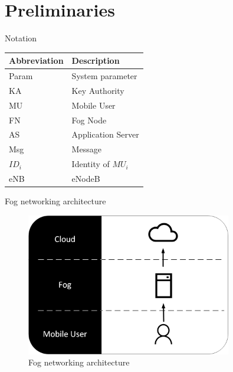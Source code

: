 \documentclass{beamer}
\begin{document}
\section{Preliminaries}
\begin{frame}{Notation}
    \begin{center}
        \begin{tabular}{ | l | l | }
            \hline
                Abbreviation                     &       Description               \\ \hline
                Param                            &       System parameter        \\ \hline
                KA                               &       Key Authority          \\ \hline
                MU                               &       Mobile User       \\ \hline
                FN                               &       Fog Node       \\ \hline
                AS                               &       Application Server       \\ \hline
                Msg                              &       Message                 \\ \hline
                $ID_{i}$                         &       Identity of $MU_{i}$           \\ \hline
                eNB                              &       eNodeB                 \\
            \hline
        \end{tabular}
    \end{center}
\end{frame}
\begin{frame}{Fog networking architecture}
    \begin{figure}[t]
        \centering
        \includegraphics[width=0.8\textwidth]{figures/fog_layer.png}
        \caption{Fog networking architecture}
    \end{figure}
\end{frame}
\end{document}
